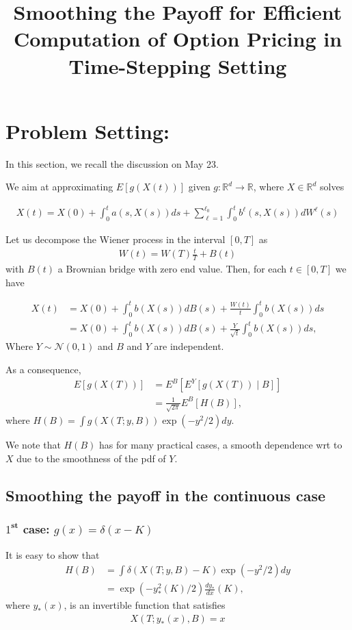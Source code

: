 \documentclass[11pt]{article}
\title{ Smoothing  the  Payoff for  Efficient Computation of Option Pricing in
  Time-Stepping Setting}
\date{ }
\begin{document}
\maketitle

\section{Problem Setting:}
In this section, we recall the discussion on May 23.

We aim at approximating $E[g(X(t))]$ given $g:\mathbb{R}^d  \rightarrow \mathbb{R}$, where $X \in \mathbb{R}^d$ solves 

\begin{align}
X(t)=X(0)+ \int_{0}^{t} a(s,X(s)) ds + \sum_{\ell=1}^{\ell_0} \int_{0}^{t} b^{\ell}(s,X(s)) dW^{\ell}(s)
\end{align}

Let us decompose the Wiener process in the interval $[0, T]$ as
\begin{align}
W(t)=W(T) \frac{t}{T}+B(t)
\end{align}
with $B(t)$  a Brownian bridge with zero end value. Then,
for each $t \in [0, T]$ we have

\begin{align}
X(t) &=X(0)+\int_{0}^{t} b(X(s)) dB(s)+\frac{W(t)}{t} \int_{0}^{t} b(X(s)) ds\nonumber\\
&=X(0)+\int_{0}^{t} b(X(s)) dB(s)+\frac{Y}{\sqrt{t}} \int_{0}^{t} b(X(s))ds,
\end{align}
Where $Y \sim \mathcal{N}(0,1)$ and $B$ and $Y$ are independent.

As a consequence,
\begin{align}\label{conditional_expectation_transformation}
E[g(X(T))]&= E^B[E^Y[g(X(T))\mid B]]\nonumber\\
&=\frac{1}{\sqrt{2 \pi}} E^B[H(B)],
\end{align}
where $H(B)=\int g(X(T;y,B)) \operatorname{exp}(-y^2/2) dy$.

We note that $H(B)$ has for many practical cases, a smooth dependence wrt to $X$ due to the smoothness of the pdf of $Y$.

\subsection{Smoothing the payoff in the continuous case}



\subsubsection{$1^{\textbf{st}}$ case: $g(x)=\delta(x-K)$}
It is easy to show that
\begin{align}\label{smoothed_integrand_delta}
H(B)&= \int \delta(X(T;y,B)-K) \operatorname{exp}(-y^2/2) dy \nonumber\\
&= \operatorname{exp}(-y^2_{\ast}(K)/2) \frac{d y_{\ast}}{dx}(K),
\end{align}
where $y_{\ast}(x)$, is an invertible function that satisfies 
\begin{align}
X(T;y_{\ast}(x),B)=x	
\end{align}
\end{document}
